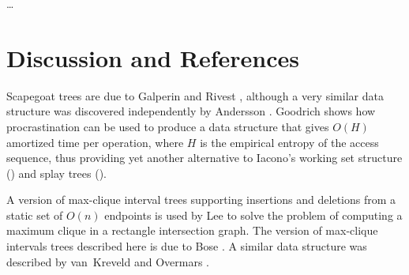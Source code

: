 \ldots

\section{Discussion and References}

Scapegoat trees are due to Galperin and Rivest \cite{gr93}, although a
very similar data structure was discovered independently by Andersson
\cite{a99}.  Goodrich \cite{g00} shows how procrastination can be used
to produce a data structure that gives $O(H)$ amortized time per
operation, where $H$ is the empirical entropy of the access sequence,
thus providing yet another alternative to Iacono's working set
structure () and splay trees ().

A version of max-clique interval trees supporting insertions and
deletions from a static set of $O(n)$ endpoints is used by Lee
\cite{l83} to solve the problem of computing a maximum clique in a
rectangle intersection graph.  The version of max-clique intervals
trees described here is due to Bose \etal \cite{bkmmm01a}.  A similar
data structure was described by van~Kreveld and Overmars \cite{ko89}.


